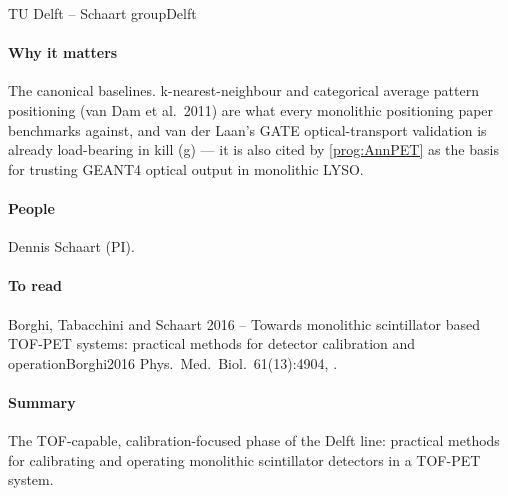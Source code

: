 \begin{programnote}{TU Delft -- Schaart group}{Delft}
 
 
\paragraph{Why it matters}
The canonical baselines. k-nearest-neighbour and categorical average pattern
positioning (van Dam et al.\ 2011) are what every monolithic positioning paper
benchmarks against, and van der Laan's GATE optical-transport validation is
already load-bearing in kill (g) --- it is also cited by \ref{prog:AnnPET} as
the basis for trusting GEANT4 optical output in monolithic LYSO.
 
\paragraph{People}
Dennis Schaart (PI). 
 
\paragraph{To read}
 
\begin{papernote}{Borghi, Tabacchini and Schaart 2016 -- Towards monolithic scintillator based TOF-PET systems: practical methods for detector calibration and operation}{Borghi2016}
Phys.\ Med.\ Biol.\ 61(13):4904, .

\paragraph{Summary}
The TOF-capable, calibration-focused phase of the Delft line: practical
methods for calibrating and operating monolithic scintillator detectors in a
TOF-PET system.

\end{papernote}
 
\end{programnote}
 
